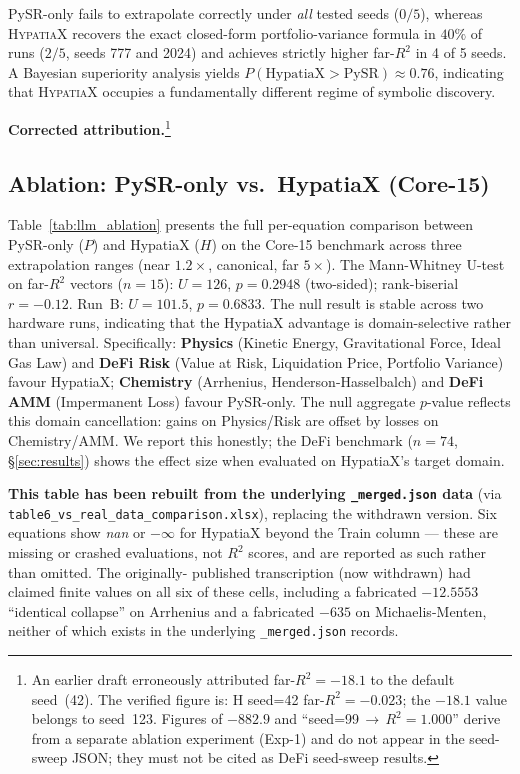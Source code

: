 \documentclass[twoside,11pt]{article}
\newcommand{\Rsq}{R^{2}}
\begin{document}
PySR-only fails to extrapolate correctly under \emph{all} tested seeds ($0/5$),
whereas \textsc{HypatiaX} recovers the exact closed-form portfolio-variance formula
in $40\%$ of runs ($2/5$, seeds 777 and 2024) and achieves strictly higher far-$\Rsq$
in 4 of 5 seeds.  A Bayesian superiority analysis yields
$P(\text{HypatiaX} > \text{PySR}) \approx 0.76$, indicating that \textsc{HypatiaX}
occupies a fundamentally different regime of symbolic discovery.

\textbf{Corrected attribution.}\footnote{An earlier draft erroneously attributed
far-$\Rsq=-18.1$ to the default seed~(42).  The verified figure is: H seed=42
far-$\Rsq=-0.023$; the $-18.1$ value belongs to seed~123.  Figures of $-882.9$ and
``seed=99\,$\to$\,$\Rsq=1.000$'' derive from a separate ablation experiment (Exp-1)
and do not appear in the seed-sweep JSON; they must not be cited as DeFi seed-sweep
results.}

\subsection{Ablation: PySR-only vs.\ HypatiaX (Core-15)}\label{subsec:ablation-pysronly-vs-hypatiax-core15}
\label{sec:ablation_core15}

Table~\ref{tab:llm_ablation} presents the full per-equation comparison between
PySR-only ($P$) and HypatiaX ($H$) on the Core-15 benchmark across three
extrapolation ranges (near $1.2\times$, canonical, far $5\times$).  The
Mann-Whitney U-test on far-$\Rsq$ vectors ($n=15$): $U=126$, $p=0.2948$
(two-sided); rank-biserial $r=-0.12$.  Run~B: $U=101.5$, $p=0.6833$.
The null result is stable across two hardware runs, indicating that the
HypatiaX advantage is domain-selective rather than universal.  Specifically:
\textbf{Physics} (Kinetic Energy, Gravitational Force, Ideal Gas Law) and
\textbf{DeFi Risk} (Value at Risk, Liquidation Price, Portfolio Variance) favour
HypatiaX; \textbf{Chemistry} (Arrhenius, Henderson-Hasselbalch) and
\textbf{DeFi AMM} (Impermanent Loss) favour PySR-only.  The null aggregate
$p$-value reflects this domain cancellation: gains on Physics/Risk are offset by
losses on Chemistry/AMM.  We report this honestly; the DeFi benchmark
($n=74$, §\ref{sec:results}) shows the effect size when evaluated on
HypatiaX's target domain.

\textbf{This table has been rebuilt from the underlying \texttt{\_merged.json}
data} (via \texttt{table6\_vs\_real\_data\_comparison.xlsx}), replacing the
withdrawn version. Six equations show \textit{nan} or $-\infty$ for HypatiaX
beyond the Train column --- these are missing or crashed evaluations, not
$\Rsq$ scores, and are reported as such rather than omitted. The originally-
published transcription (now withdrawn) had claimed finite values on all six
of these cells, including a fabricated $-12.5553$ ``identical collapse'' on
Arrhenius and a fabricated $-635$ on Michaelis-Menten, neither of which
exists in the underlying \texttt{\_merged.json} records.
\end{document}

